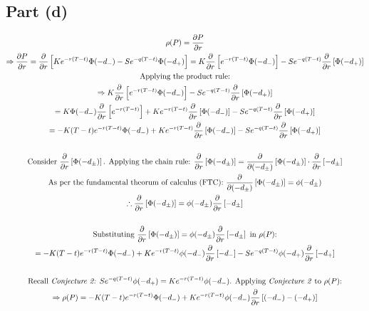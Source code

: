 \documentclass[letterpaper,10pt]{article}
\newcommand{\partiald}[2]{\frac{\partial #1}{\partial #2}}
\begin{document}
		\subsection{Part (d)}
			\begin{gather*}
				\rho(P) = \partiald{P}{r} \\
				\Rightarrow \partiald{P}{r} = \partiald{}{r} \left[ Ke^{-r(T - t)} \Phi(-d_{-}) - Se^{-q(T - t)} \Phi(-d_{+}) \right] = K \partiald{}{r} \left[ e^{-r(T-t)} \Phi(-d_-) \right] - Se^{-q(T-t)} \partiald{}{r} \left[ \Phi(-d_+) \right] \\
				\text{Applying the product rule:} \\
				\Rightarrow K \partiald{}{r} \left[ e^{-r(T-t)} \Phi(-d_-) \right] - Se^{-q(T-t)} \partiald{}{r} \left[ \Phi(-d_+) \right] \\
				= K \Phi(-d_-) \partiald{}{r} \left[ e^{-r(T-t)} \right] + K e^{-r(T-t)} \partiald{}{r} \left[ \Phi(-d_-) \right] - Se^{-q(T-t)} \partiald{}{r} \left[ \Phi(-d_+) \right] \\
				= - K (T-t) e^{-r(T-t)} \Phi(-d_-) + K e^{-r(T-t)} \partiald{}{r} \left[ \Phi(-d_-) \right] - Se^{-q(T-t)} \partiald{}{r} \left[ \Phi(-d_+) \right] \\
				\\
				\text{Consider } \partiald{}{r} \left[ \Phi(-d_\pm) \right] \text{. Applying the chain rule: } \partiald{}{r} \left[ \Phi(-d_\pm) \right] = \partiald{}{(-d_\pm)}\left[ \Phi(-d_\pm) \right] \cdot \partiald{}{r} \left[ -d_\pm \right] \\
				\text{As per the fundamental theorum of calculus (FTC): } \partiald{}{(-d_{\pm})} \left[\Phi(-d_{\pm}) \right] = \phi(-d_{\pm}) \\
				\therefore \partiald{}{r}\left[ \Phi(-d_\pm) \right] = \phi(-d_\pm) \partiald{}{r} \left[ -d_\pm \right] \\
				\\
				\text{Substituting } \partiald{}{r}\left[ \Phi(-d_\pm) \right] = \phi(-d_\pm) \partiald{}{r} \left[ -d_\pm \right] \text{ in } \rho(P) \text{:} \\
				= - K (T-t) e^{-r(T-t)} \Phi(-d_-) + Ke^{-r(T-t)}\phi(-d_-)\partiald{}{r}\left[-d_-\right] - Se^{-q(T-t)}\phi(-d_+)\partiald{}{r}\left[ -d_+ \right] \\
				\\
				\text{Recall \textit{Conjecture 2:} } Se^{-q(T-t)} \phi(-d_{+}) = Ke^{-r(T-t)}\phi(-d_{-}) \text{. Applying \textit{Conjecture 2} to } \rho(P) \text{:} \\
				\Rightarrow \rho(P) = - K (T-t) e^{-r(T-t)} \Phi(-d_-) + Ke^{-r(T-t)}\phi(-d_-)\partiald{}{r}\left[ (-d_-) - (-d_+) \right] \\

\end{gather*}
\end{document}
